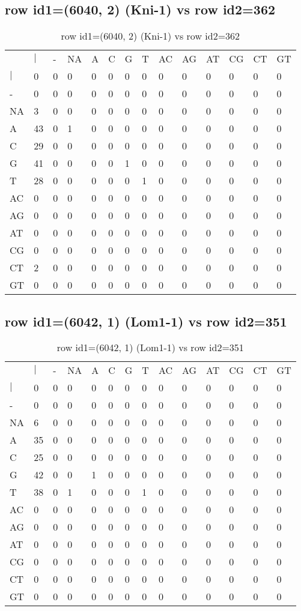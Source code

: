 \subsection{row id1=(6040, 2) (Kni-1) vs row id2=362}
\begin{center}
\begin{longtable}{|l|l|l|l|l|l|l|l|l|l|l|l|l|l|}
\caption{row id1=(6040, 2) (Kni-1) vs row id2=362} \label{table_dm24}\\
\hline
\\
\hline
&$|$&-&NA&A&C&G&T&AC&AG&AT&CG&CT&GT\\
$|$&0&0&0&0&0&0&0&0&0&0&0&0&0\\
-&0&0&0&0&0&0&0&0&0&0&0&0&0\\
NA&3&0&0&0&0&0&0&0&0&0&0&0&0\\
A&43&0&1&0&0&0&0&0&0&0&0&0&0\\
C&29&0&0&0&0&0&0&0&0&0&0&0&0\\
G&41&0&0&0&0&1&0&0&0&0&0&0&0\\
T&28&0&0&0&0&0&1&0&0&0&0&0&0\\
AC&0&0&0&0&0&0&0&0&0&0&0&0&0\\
AG&0&0&0&0&0&0&0&0&0&0&0&0&0\\
AT&0&0&0&0&0&0&0&0&0&0&0&0&0\\
CG&0&0&0&0&0&0&0&0&0&0&0&0&0\\
CT&2&0&0&0&0&0&0&0&0&0&0&0&0\\
GT&0&0&0&0&0&0&0&0&0&0&0&0&0\\
\hline
\end{longtable}
\end{center}

\subsection{row id1=(6042, 1) (Lom1-1) vs row id2=351}
\begin{center}
\begin{longtable}{|l|l|l|l|l|l|l|l|l|l|l|l|l|l|}
\caption{row id1=(6042, 1) (Lom1-1) vs row id2=351} \label{table_dm26}\\
\hline
\\
\hline
&$|$&-&NA&A&C&G&T&AC&AG&AT&CG&CT&GT\\
$|$&0&0&0&0&0&0&0&0&0&0&0&0&0\\
-&0&0&0&0&0&0&0&0&0&0&0&0&0\\
NA&6&0&0&0&0&0&0&0&0&0&0&0&0\\
A&35&0&0&0&0&0&0&0&0&0&0&0&0\\
C&25&0&0&0&0&0&0&0&0&0&0&0&0\\
G&42&0&0&1&0&0&0&0&0&0&0&0&0\\
T&38&0&1&0&0&0&1&0&0&0&0&0&0\\
AC&0&0&0&0&0&0&0&0&0&0&0&0&0\\
AG&0&0&0&0&0&0&0&0&0&0&0&0&0\\
AT&0&0&0&0&0&0&0&0&0&0&0&0&0\\
CG&0&0&0&0&0&0&0&0&0&0&0&0&0\\
CT&0&0&0&0&0&0&0&0&0&0&0&0&0\\
GT&0&0&0&0&0&0&0&0&0&0&0&0&0\\
\hline
\end{longtable}
\end{center}

